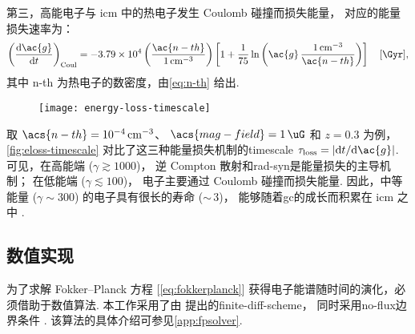 第三，高能电子与 \ac{icm} 中的热电子发生 Coulomb 碰撞而损失能量，
对应的能量损失速率为：
\begin{equation}
  \label{eq:eloss-coul}
  \left( \diff{\ac{g}}{t} \right)_{\R{Coul}} =
    \num{-3.79e4} \left( \frac{\ac{n-th}}{\SI{1}{\per\cm\cubed}} \right)
    \left[ 1 + \frac{1}{75} \ln \left(
        \ac{g}\,\frac{\SI{1}{\per\cm\cubed}}{\ac{n-th}} \right) \right]
    \quad [\si{\per\Gyr}] ,
\end{equation}
其中 \ac{n-th} 为热电子的数密度，由\autoref{eq:n-th} 给出.

\begin{figure}[htp]
  \centering
  \texttt{[image: energy-loss-timescale]}
  \label{fig:eloss-timescale}
\end{figure}

取 $\acs{n-th} = \SI{e-4}{\per\cubic\cm}$、
$\acs{mag-field} = \SI{1}{\uG}$ 和 $z = 0.3$ 为例，
\autoref{fig:eloss-timescale} 对比了这三种能量损失机制的\ac{timescale}
$\tau_{\R{loss}} = |\D{t}/\D{\ac{g}}|$.
可见，在高能端 ($\gamma \gtrsim 1000$)，
逆 Compton 散射和\ac{rad-syn}是能量损失的主导机制；
在低能端 ($\gamma \lesssim 100$)，
电子主要通过 Coulomb 碰撞而损失能量.
因此，中等能量 ($\gamma \sim 300$) 的电子具有很长的寿命 ($\sim$\,\SI{3}{\Gyr})，
能够随着\ac{gc}的成长而积累在 \ac{icm} 之中 \cite{sarazin1999}.

\subsection{数值实现}
\label{sec:numerical}

为了求解 Fokker--Planck 方程 [\autoref{eq:fokkerplanck}]
获得电子能谱随时间的演化，必须借助于数值算法.
本工作采用了由  提出的\ac{finite-diff-scheme}，
同时采用\ac{no-flux}边界条件 \cite{park1996}.
该算法的具体介绍可参见\autoref{app:fpsolver}.

